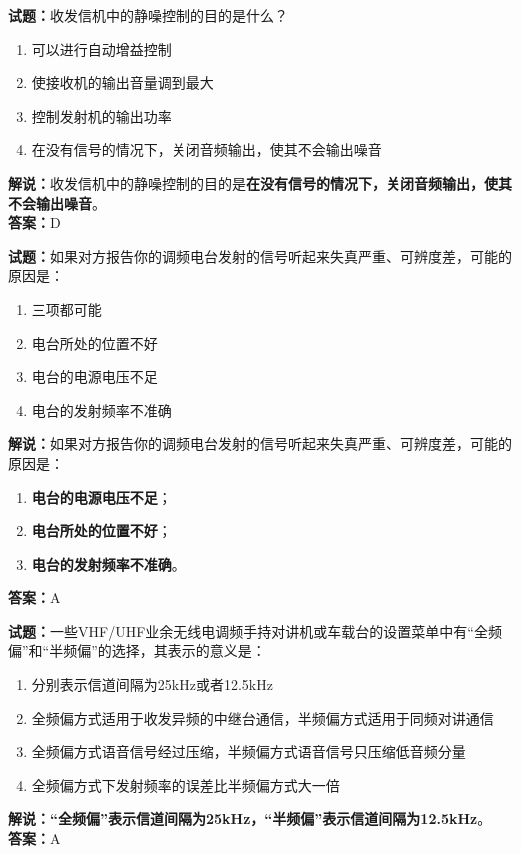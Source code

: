 \documentclass{ctexbook}
\begin{document}
\noindent\textbf{试题：}收发信机中的静噪控制的目的是什么？
\begin{enumerate}[leftmargin=3em]
\item 可以进行自动增益控制
\item 使接收机的输出音量调到最大
\item 控制发射机的输出功率
\item 在没有信号的情况下，关闭音频输出，使其不会输出噪音%
\end{enumerate}
\noindent\textbf{解说：}收发信机中的静噪控制的目的是\textbf{在没有信号的情况下，关闭音频输出，使其不会输出噪音}。\\\noindent\textbf{答案：}D




\bigskip


\noindent\textbf{试题：}如果对方报告你的调频电台发射的信号听起来失真严重、可辨度差，可能的原因是：
\begin{enumerate}[leftmargin=3em]
\item 三项都可能
\item 电台所处的位置不好
\item 电台的电源电压不足
\item 电台的发射频率不准确
\end{enumerate}
\noindent\textbf{解说：}如果对方报告你的调频电台发射的信号听起来失真严重、可辨度差，可能的原因是：
\begin{enumerate}[label=, leftmargin=3em]
\item \textbf{电台的电源电压不足}；
\item \textbf{电台所处的位置不好}；
\item \textbf{电台的发射频率不准确}。
\end{enumerate}
\noindent\textbf{答案：}A



\bigskip


\noindent\textbf{试题：}一些VHF/UHF业余无线电调频手持对讲机或车载台的设置菜单中有“全频偏”和“半频偏”的选择，其表示的意义是：
\begin{enumerate}[leftmargin=3em]
\item 分别表示信道间隔为25kHz或者12.5kHz
\item 全频偏方式适用于收发异频的中继台通信，半频偏方式适用于同频对讲通信
\item 全频偏方式语音信号经过压缩，半频偏方式语音信号只压缩低音频分量
\item 全频偏方式下发射频率的误差比半频偏方式大一倍
\end{enumerate}
\noindent\textbf{解说：}\textbf{“全频偏”表示信道间隔为25kHz，“半频偏”表示信道间隔为12.5kHz}。\\\noindent\textbf{答案：}A
\end{document}
